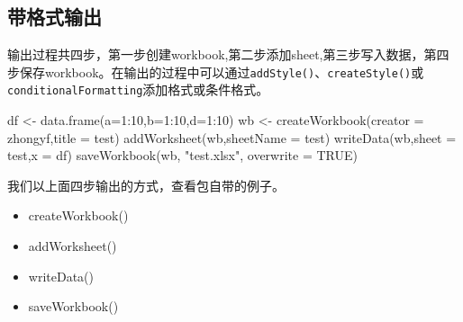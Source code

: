 \documentclass[
]{book}
\newenvironment{Shaded}{\begin{snugshade}}{\end{snugshade}}
\newcommand{\AttributeTok}[1]{\textcolor[rgb]{0.77,0.63,0.00}{#1}}
\newcommand{\ConstantTok}[1]{\textcolor[rgb]{0.00,0.00,0.00}{#1}}
\newcommand{\DecValTok}[1]{\textcolor[rgb]{0.00,0.00,0.81}{#1}}
\newcommand{\FunctionTok}[1]{\textcolor[rgb]{0.00,0.00,0.00}{#1}}
\newcommand{\NormalTok}[1]{#1}
\newcommand{\OtherTok}[1]{\textcolor[rgb]{0.56,0.35,0.01}{#1}}
\newcommand{\SpecialCharTok}[1]{\textcolor[rgb]{0.00,0.00,0.00}{#1}}
\newcommand{\StringTok}[1]{\textcolor[rgb]{0.31,0.60,0.02}{#1}}
\begin{document}
\hypertarget{ux5e26ux683cux5f0fux8f93ux51fa}{%
\subsection{带格式输出}\label{ux5e26ux683cux5f0fux8f93ux51fa}}

输出过程共四步，第一步创建workbook,第二步添加sheet,第三步写入数据，第四步保存workbook。在输出的过程中可以通过\texttt{addStyle()}、\texttt{createStyle()}或\texttt{conditionalFormatting}添加格式或条件格式。

\begin{Shaded}
\begin{Highlighting}[]
\NormalTok{df }\OtherTok{\textless{}{-}} \FunctionTok{data.frame}\NormalTok{(}\AttributeTok{a=}\DecValTok{1}\SpecialCharTok{:}\DecValTok{10}\NormalTok{,}\AttributeTok{b=}\DecValTok{1}\SpecialCharTok{:}\DecValTok{10}\NormalTok{,}\AttributeTok{d=}\DecValTok{1}\SpecialCharTok{:}\DecValTok{10}\NormalTok{)}
\NormalTok{wb }\OtherTok{\textless{}{-}} \FunctionTok{createWorkbook}\NormalTok{(}\AttributeTok{creator =} \StringTok{\textquotesingle{}zhongyf\textquotesingle{}}\NormalTok{,}\AttributeTok{title =} \StringTok{\textquotesingle{}test\textquotesingle{}}\NormalTok{)}
\FunctionTok{addWorksheet}\NormalTok{(wb,}\AttributeTok{sheetName =} \StringTok{\textquotesingle{}test\textquotesingle{}}\NormalTok{)}
\FunctionTok{writeData}\NormalTok{(wb,}\AttributeTok{sheet =} \StringTok{\textquotesingle{}test\textquotesingle{}}\NormalTok{,}\AttributeTok{x =}\NormalTok{ df)}
\FunctionTok{saveWorkbook}\NormalTok{(wb, }\StringTok{"test.xlsx"}\NormalTok{, }\AttributeTok{overwrite =} \ConstantTok{TRUE}\NormalTok{)}
\end{Highlighting}
\end{Shaded}

我们以上面四步输出的方式，查看包自带的例子。

\begin{itemize}
\item
  createWorkbook()
\item
  addWorksheet()
\item
  writeData()
\item
  saveWorkbook()
\end{itemize}
\end{document}
